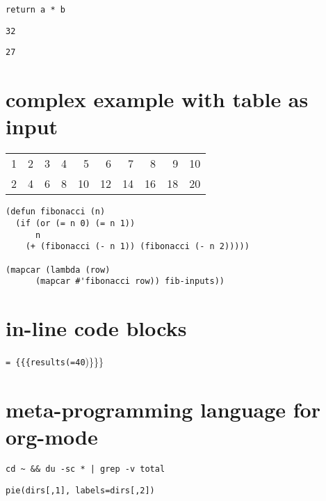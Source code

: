 \documentclass[11pt]{article}
\begin{document}
\begin{verbatim}
return a * b
\end{verbatim}


\begin{verbatim}
32
\end{verbatim}


\begin{verbatim}
27
\end{verbatim}
\section{complex example with table as input}
\label{sec:org4784756}


\begin{table}[htbp]
\label{tab:orgb859955}
\centering
\begin{tabular}{rrrrrrrrrr}
1 & 2 & 3 & 4 & 5 & 6 & 7 & 8 & 9 & 10\\
2 & 4 & 6 & 8 & 10 & 12 & 14 & 16 & 18 & 20\\
\end{tabular}
\end{table}


\begin{verbatim}
(defun fibonacci (n)
  (if (or (= n 0) (= n 1))
      n
    (+ (fibonacci (- n 1)) (fibonacci (- n 2)))))

(mapcar (lambda (row)
	  (mapcar #'fibonacci row)) fib-inputs))
\end{verbatim}


\section{in-line code blocks}
\label{sec:org479434f}

\texttt{=
\{\{\{results(=40})\}\}\}

\section{meta-programming language for org-mode}
\label{sec:orgba81a45}

\begin{verbatim}
cd ~ && du -sc * | grep -v total
\end{verbatim}

\begin{verbatim}
pie(dirs[,1], labels=dirs[,2])
\end{verbatim}
\end{document}
